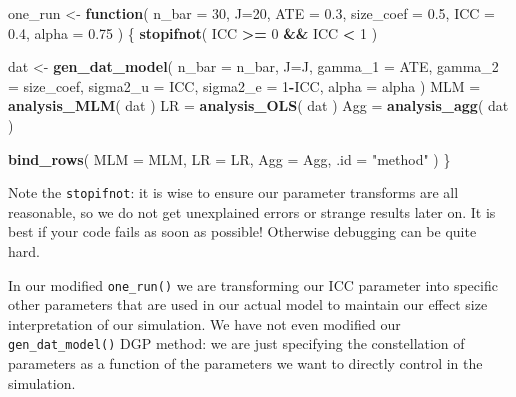\documentclass[
]{book}
\newenvironment{Shaded}{\begin{snugshade}}{\end{snugshade}}
\newcommand{\AttributeTok}[1]{\textcolor[rgb]{0.13,0.29,0.53}{#1}}
\newcommand{\ControlFlowTok}[1]{\textcolor[rgb]{0.13,0.29,0.53}{\textbf{#1}}}
\newcommand{\DecValTok}[1]{\textcolor[rgb]{0.00,0.00,0.81}{#1}}
\newcommand{\FloatTok}[1]{\textcolor[rgb]{0.00,0.00,0.81}{#1}}
\newcommand{\FunctionTok}[1]{\textcolor[rgb]{0.13,0.29,0.53}{\textbf{#1}}}
\newcommand{\NormalTok}[1]{#1}
\newcommand{\OtherTok}[1]{\textcolor[rgb]{0.56,0.35,0.01}{#1}}
\newcommand{\SpecialCharTok}[1]{\textcolor[rgb]{0.81,0.36,0.00}{\textbf{#1}}}
\newcommand{\StringTok}[1]{\textcolor[rgb]{0.31,0.60,0.02}{#1}}
\begin{document}
\begin{Shaded}
\begin{Highlighting}[]
\NormalTok{one\_run }\OtherTok{\textless{}{-}} \ControlFlowTok{function}\NormalTok{( }\AttributeTok{n\_bar =} \DecValTok{30}\NormalTok{, }\AttributeTok{J=}\DecValTok{20}\NormalTok{, }
                     \AttributeTok{ATE =} \FloatTok{0.3}\NormalTok{, }\AttributeTok{size\_coef =} \FloatTok{0.5}\NormalTok{,}
                     \AttributeTok{ICC =} \FloatTok{0.4}\NormalTok{,}
                     \AttributeTok{alpha =} \FloatTok{0.75}\NormalTok{ ) \{}
    \FunctionTok{stopifnot}\NormalTok{( ICC }\SpecialCharTok{\textgreater{}=} \DecValTok{0} \SpecialCharTok{\&\&}\NormalTok{ ICC }\SpecialCharTok{\textless{}} \DecValTok{1}\NormalTok{ )}

\NormalTok{  dat }\OtherTok{\textless{}{-}} \FunctionTok{gen\_dat\_model}\NormalTok{( }\AttributeTok{n\_bar =}\NormalTok{ n\_bar, }\AttributeTok{J=}\NormalTok{J, }
                        \AttributeTok{gamma\_1 =}\NormalTok{ ATE, }\AttributeTok{gamma\_2 =}\NormalTok{ size\_coef,}
                        \AttributeTok{sigma2\_u =}\NormalTok{ ICC, }\AttributeTok{sigma2\_e =} \DecValTok{1}\SpecialCharTok{{-}}\NormalTok{ICC,}
                        \AttributeTok{alpha =}\NormalTok{ alpha )}
\NormalTok{  MLM }\OtherTok{=} \FunctionTok{analysis\_MLM}\NormalTok{( dat )}
\NormalTok{  LR }\OtherTok{=} \FunctionTok{analysis\_OLS}\NormalTok{( dat )}
\NormalTok{  Agg }\OtherTok{=} \FunctionTok{analysis\_agg}\NormalTok{( dat )}
  
  \FunctionTok{bind\_rows}\NormalTok{( }\AttributeTok{MLM =}\NormalTok{ MLM, }\AttributeTok{LR =}\NormalTok{ LR, }\AttributeTok{Agg =}\NormalTok{ Agg,}
             \AttributeTok{.id =} \StringTok{"method"}\NormalTok{ )}
\NormalTok{\}}
\end{Highlighting}
\end{Shaded}

Note the \texttt{stopifnot}: it is wise to ensure our parameter transforms are all reasonable, so we do not get unexplained errors or strange results later on.
It is best if your code fails as soon as possible! Otherwise debugging can be quite hard.

In our modified \texttt{one\_run()} we are transforming our ICC parameter into specific other parameters that are used in our actual model to maintain our effect size interpretation of our simulation.
We have not even modified our \texttt{gen\_dat\_model()} DGP method: we are just specifying the constellation of parameters as a function of the parameters we want to directly control in the simulation.
\end{document}
